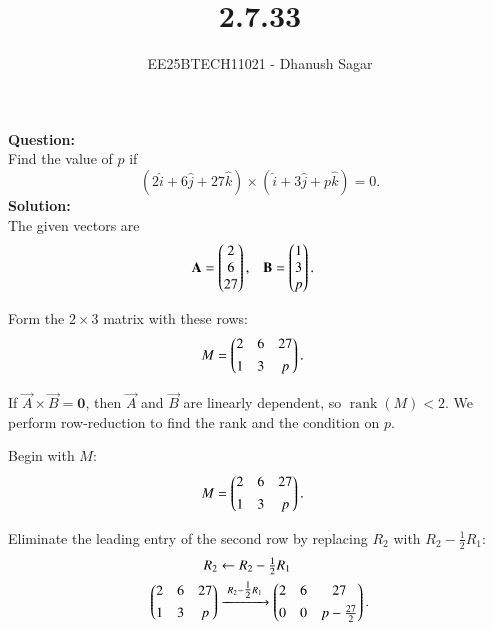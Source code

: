 \documentclass[journal]{IEEEtran}
\begin{document}



\title{2.7.33}
\author{EE25BTECH11021 - Dhanush Sagar
}
{\let\newpage\relax\maketitle}

\renewcommand{\thefigure}{\theenumi}
\renewcommand{\thetable}{\theenumi}
\setlength{\intextsep}{10pt} %


\renewcommand{\thetable}{\theenumi}


\textbf{Question:} \\
Find the value of $p$ if
\[
(2\hat{i} + 6\hat{j} + 27\hat{k}) \times (\hat{i} + 3\hat{j} + p\hat{k}) = 0.
\]
\textbf{Solution:} \\
The given vectors are
\begin{align}
\mathbf{A} &= \begin{pmatrix}2 \\ 6 \\ 27\end{pmatrix}, 
& \mathbf{B} &= \begin{pmatrix}1 \\ 3 \\ p\end{pmatrix}.
\end{align}

Form the $2\times 3$ matrix with these rows:
\begin{align}
M &= \begin{pmatrix}2 & 6 & 27 \\[4pt] 1 & 3 & p \end{pmatrix}.
\end{align}

If \(\vec{A}\times\vec{B}=\mathbf{0}\), then \(\vec{A}\) and \(\vec{B}\) are linearly dependent, so \(\operatorname{rank}(M)<2\). We perform row-reduction to find the rank and the condition on \(p\).

Begin with \(M\):
\begin{align}
M &= \begin{pmatrix}2 & 6 & 27 \\[4pt] 1 & 3 & p \end{pmatrix}.
\end{align}

Eliminate the leading entry of the second row by replacing \(R_2\) with \(R_2 - \tfrac{1}{2}R_1\):
\begin{align}
\begin{aligned}
R_2 &\leftarrow R_2 - \tfrac{1}{2}R_1 \\
\begin{pmatrix}2 & 6 & 27 \\[4pt] 1 & 3 & p \end{pmatrix}
&\xrightarrow{\;R_2 - \tfrac{1}{2}R_1\;}
\begin{pmatrix}2 & 6 & 27 \\[4pt] 0 & 0 & p - \tfrac{27}{2} \end{pmatrix}.
\end{aligned}
\end{align}
\end{document}
